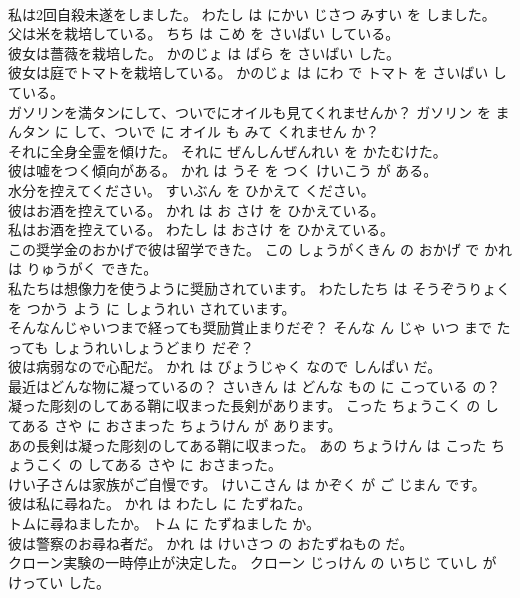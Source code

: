 \documentclass[8pt]{extreport}
\begin{document}
\begin{CJK}{UTF8}{min}
\\	私は2回自殺未遂をしました。	わたし は にかい じさつ みすい を しました。	
\\	父は米を栽培している。	ちち は こめ を さいばい している。	
\\	彼女は薔薇を栽培した。	かのじょ は ばら を さいばい した。	
\\	彼女は庭でトマトを栽培している。	かのじょ は にわ で トマト を さいばい している。	
\\	ガソリンを満タンにして、ついでにオイルも見てくれませんか？	ガソリン を まんタン に して、ついで に オイル も みて くれません か？	
\\	それに全身全霊を傾けた。	それに ぜんしんぜんれい を かたむけた。	
\\	彼は嘘をつく傾向がある。	かれ は うそ を つく けいこう が ある。	
\\	水分を控えてください。	すいぶん を ひかえて ください。	
\\	彼はお酒を控えている。	かれ は お さけ を ひかえている。	
\\	私はお酒を控えている。	わたし は おさけ を ひかえている。	
\\	この奨学金のおかげで彼は留学できた。	この しょうがくきん の おかげ で かれ は りゅうがく できた。	
\\	私たちは想像力を使うように奨励されています。	わたしたち は そうぞうりょく を つかう よう に しょうれい されています。	
\\	そんなんじゃいつまで経っても奨励賞止まりだぞ？	そんな ん じゃ いつ まで たっても しょうれいしょうどまり だぞ？	
\\	彼は病弱なので心配だ。	かれ は びょうじゃく なので しんぱい だ。	
\\	最近はどんな物に凝っているの？	さいきん は どんな もの に こっている の？	
\\	凝った彫刻のしてある鞘に収まった長剣があります。	こった ちょうこく の してある さや に おさまった ちょうけん が あります。	
\\	あの長剣は凝った彫刻のしてある鞘に収まった。	あの ちょうけん は こった ちょうこく の してある さや に おさまった。	
\\	けい子さんは家族がご自慢です。	けいこさん は かぞく が ご じまん です。	
\\	彼は私に尋ねた。	かれ は わたし に たずねた。	
\\	トムに尋ねましたか。	トム に たずねました か。	
\\	彼は警察のお尋ね者だ。	かれ は けいさつ の おたずねもの だ。	
\\	クローン実験の一時停止が決定した。	クローン じっけん の いちじ ていし が けってい した。	

\end{CJK}
\end{document}
